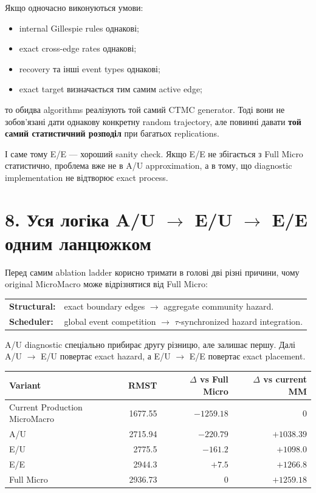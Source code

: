 \documentclass[11pt,a4paper]{article}
\begin{document}
Якщо одночасно виконуються умови:
\begin{itemize}[nosep]
\item internal Gillespie rules однакові;
\item exact cross-edge rates однакові;
\item recovery та інші event types однакові;
\item exact target визначається тим самим active edge;
\end{itemize}
то обидва algorithms реалізують той самий CTMC generator. Тоді вони не зобов'язані дати однакову конкретну random trajectory, але повинні давати \textbf{той самий статистичний розподіл} при багатьох replications.

І саме тому E/E --- хороший sanity check. Якщо E/E не збігається з Full Micro статистично, проблема вже не в A/U approximation, а в тому, що diagnostic implementation не відтворює exact process.

\section*{8. Уся логіка A/U $\to$ E/U $\to$ E/E одним ланцюжком}

Перед самим ablation ladder корисно тримати в голові дві різні причини, чому original MicroMacro може відрізнятися від Full Micro:
\begin{center}
\begin{tabular}{>{\raggedright\arraybackslash}p{29mm} >{\raggedright\arraybackslash}p{112mm}}
\textbf{Structural:} & exact boundary edges $\to$ aggregate community hazard.\\[2pt]
\textbf{Scheduler:} & global event competition $\to$ $\tau$-synchronized hazard integration.
\end{tabular}
\end{center}
A/U diagnostic спеціально прибирає другу різницю, але залишає першу. Далі A/U $\to$ E/U повертає exact hazard, а E/U $\to$ E/E повертає exact placement.


\begin{center}
\begin{tabular}{l r r r}
\toprule
\textbf{Variant} & \textbf{RMST} & \textbf{$\Delta$ vs Full Micro} & \textbf{$\Delta$ vs current MM}\\
\midrule
Current Production MicroMacro & 1677.55 & $-1259.18$ & 0\\
A/U & 2715.94 & $-220.79$ & $+1038.39$\\
E/U & 2775.5 & $-161.2$ & $+1098.0$\\
E/E & 2944.3 & $+7.5$ & $+1266.8$\\
Full Micro & 2936.73 & 0 & $+1259.18$\\
\bottomrule
\end{tabular}
\end{center}
\end{document}
